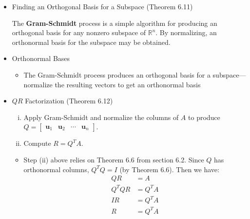 \documentclass[10pt]{book}
\newenvironment{boxdef}{\begin{mdframed}[backgroundcolor=gray!30,linewidth=0pt,nobreak=true]}{\end{mdframed}}
\newcommand{\R}{\mathbb{R}}
\newcommand{\vect}[1]{\ensuremath{\boldsymbol{\mathbf{#1}}}}
\begin{document}
\begin{itemize}
	\item Finding an Orthogonal Basis for a Subspace (Theorem 6.11)
		\begin{boxdef}
			The \textbf{Gram-Schmidt} process is a simple algorithm for producing an orthogonal basis for any nonzero subspace of $\R^n$. By normalizing, an orthonormal basis for the subspace may be obtained.
		\end{boxdef}
	\item Orthonormal Bases
		\begin{itemize}
			\item The Gram-Schmidt process produces an orthogonal basis for a subspace---normalize the resulting vectors to get an orthonormal basis
		\end{itemize}
	\item $QR$ Factorization (Theorem 6.12)
		\begin{enumerate}[(i)]
			\item Apply Gram-Schmidt and normalize the columns of $A$ to produce $Q=\begin{bmatrix}\vect{u}_1&\vect{u}_2&\cdots&\vect{u}_n\end{bmatrix}$.
			\item Compute $R=Q^TA$.
		\end{enumerate}
		\begin{itemize}
			\item Step (ii) above relies on Theorem 6.6 from section 6.2. Since $Q$ has orthonormal columns, $Q^TQ=I$ (by Theorem 6.6). Then we have:
			\vspace{-1em}
				\begin{align*}
					QR &= A \\
					Q^TQR &= Q^TA \\
					IR &= Q^TA \\
					R &= Q^TA
				\end{align*}
		\end{itemize}
\end{itemize}
\end{document}
